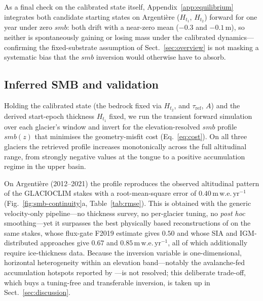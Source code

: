 As a final check on the calibrated state itself, Appendix~\ref{app:equilibrium}
integrates both candidate starting states on Argentière ($H_{t_1}$, $H_{t_2}$)
forward for one year under zero $smb$: both drift with a near-zero mean
($-0.3$ and $-0.1\,\mathrm{m}$), so neither is spontaneously gaining or losing
mass under the calibrated dynamics---confirming the fixed-substrate assumption of
Sect.~\ref{sec:overview} is not masking a systematic bias that the $smb$ inversion
would otherwise have to absorb.

\subsection{Inferred SMB and validation}\label{sec:inferred}

Holding the calibrated state (the bedrock fixed via $H_{t_2}$, and $\tau_{\mathrm{ref}}$, $A$) and the derived start-epoch thickness $H_{t_1}$ fixed, we run the
transient forward simulation over each glacier's window and invert for the
elevation-resolved $smb$ profile $smb(z)$ that minimises the geometry-misfit cost
(Eq.~\ref{eq:cost}). On all three glaciers the retrieved profile increases
monotonically across the full altitudinal range, from strongly negative values at
the tongue to a positive accumulation regime in the upper basin.

On Argentière (2012--2021) the profile reproduces the observed altitudinal pattern
of the GLACIOCLIM stakes with a root-mean-square error of
$0.40\,\mathrm{m\,w.e.\,yr^{-1}}$ (Fig.~\ref{fig:smb-continuity}a,
Table~\ref{tab:rmse}). This is obtained with the generic velocity-only
pipeline---no thickness survey, no per-glacier tuning, no \emph{post hoc}
smoothing---yet it surpasses the best physically based reconstructions of
\citet{kneib2024} on the same stakes, whose flux-gate F2019 estimate gives $0.50$
and whose SIA and IGM-distributed approaches give $0.67$ and
$0.85\,\mathrm{m\,w.e.\,yr^{-1}}$, all of which additionally require ice-thickness
data. Because the inversion variable is one-dimensional,
horizontal heterogeneity within an elevation band---notably the avalanche-fed
accumulation hotspots reported by \citet{kneib2024}---is not resolved; this
deliberate trade-off, which buys a tuning-free and transferable inversion, is taken
up in Sect.~\ref{sec:discussion}.

